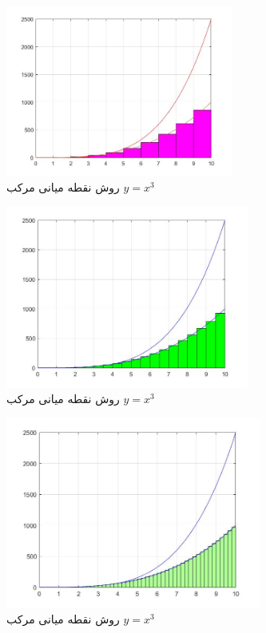 \documentclass{article}
\begin{document}
\begin{figure}[!h]
    \centering
\includegraphics[width=7.5cm]{pic35codeIntegral.jpg}
    \caption{ روش نقطه میانی مرکب $y=x^3$ }
    \label{fig:انتگرال خط}
\end{figure}



\begin{figure}[!h]
    \centering
\includegraphics[width=8cm]{pic36codeIntegral.jpg}
    \caption{ روش نقطه میانی مرکب $y=x^3$ }
    \label{fig:انتگرال خط}
\end{figure}


\begin{figure}[!h]
    \centering
\includegraphics[width=8.4cm]{pic37codeIntegral.jpg}
    \caption{ روش نقطه میانی مرکب $y=x^3$ }
    \label{fig:انتگرال خط}
\end{figure}
\end{document}
